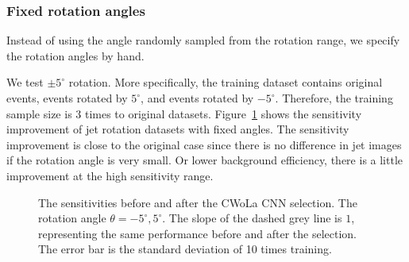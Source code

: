 \documentclass[12pt]{article}
\begin{document}
        \subsubsection{Fixed rotation angles}%
        \label{subs:fixed_rotation_angles}
            Instead of using the angle randomly sampled from the rotation range, we specify the rotation angles by hand.

            We test $\pm 5^\circ$ rotation. More specifically, the training dataset contains original events, events rotated by $5^\circ$, and events rotated by $-5^\circ$. Therefore, the training sample size is 3 times to original datasets. Figure~\ref{fig:sensitivity_improvement_origin_jet_aug_angles_-5_5} shows the sensitivity improvement of jet rotation datasets with fixed angles. The sensitivity improvement is close to the original case since there is no difference in jet images if the rotation angle is very small. Or lower background efficiency, there is a little improvement at the high sensitivity range.
        \begin{figure}[htpb]
            \centering
            \caption{The sensitivities before and after the CWoLa CNN selection. The rotation angle $\theta = -5^\circ, 5^\circ$. The slope of the dashed grey line is $1$, representing the same performance before and after the selection. The error bar is the standard deviation of 10 times training.}
            \label{fig:sensitivity_improvement_origin_jet_aug_angles_-5_5}
        \end{figure}
\end{document}
